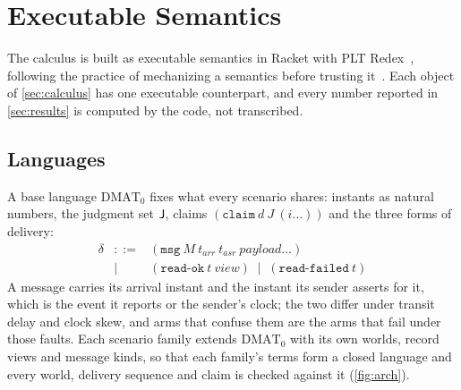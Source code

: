 \section{Executable Semantics}
\label{sec:method}

The calculus is built as executable semantics in Racket with PLT Redex~\cite{felleisen2009redex}, following the practice of mechanizing a semantics before trusting it~\cite{klein2012run}. Each object of \cref{sec:calculus} has one executable counterpart, and every number reported in \cref{sec:results} is computed by the code, not transcribed.

\subsection{Languages}

A base language $\mathrm{DMAT_0}$ fixes what every scenario shares: instants as natural numbers, the judgment set $\mathsf{J}$, claims $(\mathtt{claim}\ d\ J\ (i\ldots))$ and the three forms of delivery:
\[
\begin{array}{rcl}
\delta & ::= & (\mathtt{msg}\ M\ t_{\mathit{arr}}\ t_{\mathit{asr}}\ \mathit{payload}\ldots) \\
       & \mid & (\mathtt{read\text{-}ok}\ t\ \mathit{view}) \;\mid\; (\mathtt{read\text{-}failed}\ t)
\end{array}
\]
A message carries its arrival instant and the instant its sender asserts for it, which is the event it reports or the sender's clock; the two differ under transit delay and clock skew, and arms that confuse them are the arms that fail under those faults. Each scenario family extends $\mathrm{DMAT_0}$ with its own worlds, record views and message kinds, so that each family's terms form a closed language and every world, delivery sequence and claim is checked against it (\cref{fig:arch}).

